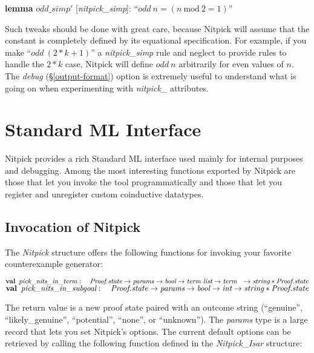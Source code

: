 \documentclass[a4paper,12pt]{article}
\begin{document}
\prew
\textbf{lemma} $\mathit{odd\_simp}'$ [\textit{nitpick\_simp}]: ``$\textit{odd}~n = (n~\textrm{mod}~2 = 1)$''
\postw

Such tweaks should be done with great care, because Nitpick will assume that the
constant is completely defined by its equational specification. For example, if
you make ``$\textit{odd}~(2 * k + 1)$'' a \textit{nitpick\_simp} rule and neglect to provide rules to handle the $2 * k$ case, Nitpick will define
$\textit{odd}~n$ arbitrarily for even values of $n$. The \textit{debug}
(\S\ref{output-format}) option is extremely useful to understand what is going
on when experimenting with \textit{nitpick\_} attributes.

\section{Standard ML Interface}
\label{standard-ml-interface}

Nitpick provides a rich Standard ML interface used mainly for internal purposes
and debugging. Among the most interesting functions exported by Nitpick are
those that let you invoke the tool programmatically and those that let you
register and unregister custom coinductive datatypes.

\subsection{Invocation of Nitpick}
\label{invocation-of-nitpick}

The \textit{Nitpick} structure offers the following functions for invoking your
favorite counterexample generator:

\prew
$\textbf{val}\,~\textit{pick\_nits\_in\_term} : \\
\hbox{}\quad\textit{Proof.state} \rightarrow \textit{params} \rightarrow \textit{bool} \rightarrow \textit{term~list} \rightarrow \textit{term} \\
\hbox{}\quad{\rightarrow}\; \textit{string} * \textit{Proof.state}$ \\
$\textbf{val}\,~\textit{pick\_nits\_in\_subgoal} : \\
\hbox{}\quad\textit{Proof.state} \rightarrow \textit{params} \rightarrow \textit{bool} \rightarrow \textit{int} \rightarrow \textit{string} * \textit{Proof.state}$
\postw

The return value is a new proof state paired with an outcome string
(``genuine'', ``likely\_genuine'', ``potential'', ``none'', or ``unknown''). The
\textit{params} type is a large record that lets you set Nitpick's options. The
current default options can be retrieved by calling the following function
defined in the \textit{Nitpick\_Isar} structure:
\end{document}
